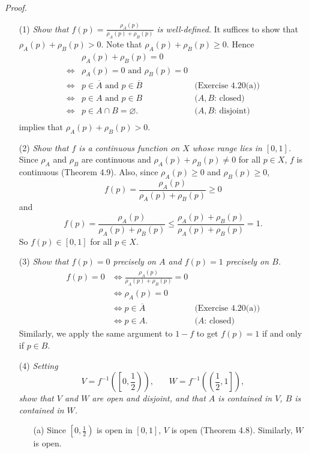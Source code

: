 \documentclass{article}
\begin{document}
\emph{Proof.}
\begin{enumerate}
\item[(1)]
\emph{Show that $f(p) = \frac{\rho_A(p)}{\rho_A(p)+\rho_B(p)}$ is well-defined.}
It suffices to show that $\rho_A(p)+\rho_B(p) > 0$.
Note that $\rho_A(p)+\rho_B(p) \geq 0$.
Hence
\begin{align*}
  &\rho_A(p)+\rho_B(p) = 0 \\
  \Longleftrightarrow&
  \rho_A(p) = 0 \text{ and } \rho_B(p) = 0 \\
  \Longleftrightarrow&
  p \in \overline{A} \text{ and } p \in \overline{B}
    &\text{(Exercise 4.20(a))} \\
  \Longleftrightarrow&
  p \in A \text{ and } p \in B
    &\text{($A, B$: closed)} \\
  \Longleftrightarrow&
  p \in A \cap B = \varnothing.
    &\text{($A, B$: disjoint)} \\
\end{align*}
implies that $\rho_A(p)+\rho_B(p) > 0$.

\item[(2)]
\emph{Show that $f$ is a continuous function on $X$ whose range lies in $[0,1]$.}
Since $\rho_A$ and $\rho_B$ are continuous and
$\rho_A(p)+\rho_B(p) \neq 0$ for all $p \in X$,
$f$ is continuous (Theorem 4.9).
Also, since $\rho_A(p) \geq 0$ and $\rho_B(p) \geq 0$,
\[
  f(p)
  = \frac{\rho_A(p)}{\rho_A(p)+\rho_B(p)}
  \geq 0
\]
and
\[
  f(p)
  = \frac{\rho_A(p)}{\rho_A(p)+\rho_B(p)}
  \leq \frac{\rho_A(p)+\rho_B(p)}{\rho_A(p)+\rho_B(p)}
  = 1.
\]
So $f(p) \in [0,1]$ for all $p \in X$.

\item[(3)]
\emph{Show that $f(p) = 0$ precisely on $A$ and $f(p) = 1$ precisely on $B$.}
\begin{align*}
  f(p) = 0
  &\Longleftrightarrow
  \frac{\rho_A(p)}{\rho_A(p)+\rho_B(p)} = 0 \\
  &\Longleftrightarrow
  \rho_A(p) = 0 \\
  &\Longleftrightarrow
  p \in \overline{A}
    &\text{(Exercise 4.20(a))} \\
  &\Longleftrightarrow
  p \in A.
    &\text{($A$: closed)}
\end{align*}
Similarly, we apply the same argument to $1 - f$ to get
$f(p) = 1$ if and only if $p \in B$.

\item[(4)]
\emph{Setting
\[
  V = f^{-1}{\left(\left[0,\frac{1}{2}\right)\right)},
  \:\:\:\:\:\:\:\:
  W = f^{-1}{\left(\left(\frac{1}{2},1\right]\right)},
\]
show that $V$ and $W$ are open and disjoint,
and that $A$ is contained in $V$, $B$ is contained in $W$.}
  \begin{enumerate}
  \item[(a)]
  Since $\left[0,\frac{1}{2}\right)$ is open in $[0,1]$,
  $V$ is open (Theorem 4.8).
  Similarly, $W$ is open.


\end{enumerate}
\end{enumerate}
\end{document}
